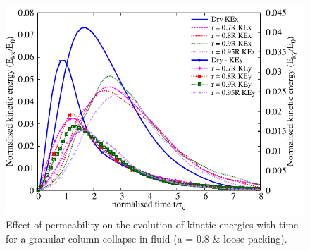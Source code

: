 \documentclass[12pt,a4paper,twocolumn,fleqn]{narms}
\begin{document}
\begin{figure}
    \includegraphics[width=\linewidth]{figs/KExy_a08_loose}
    \caption{Effect of permeability on the evolution of kinetic energies with time 
for a granular column collapse in fluid (a = 0.8 \& loose packing).}
    \label{fig:KExy_a08_loose}
\end{figure}
\end{document}
